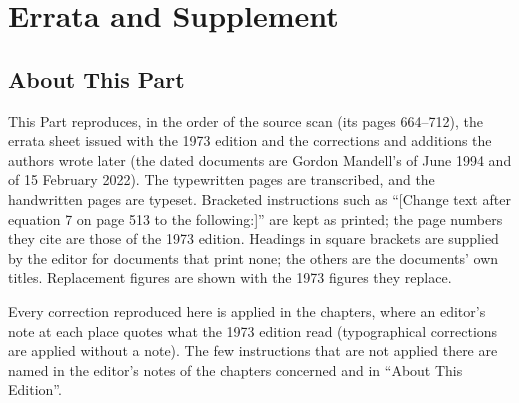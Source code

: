 \cleardoublepage
{}
{}
\part*{Errata and Supplement}
\label{supp}

\chapter*{About This Part}
\label{supp:about}
This Part reproduces, in the order of the source scan (its pages 664--712), the errata sheet issued
with the 1973 edition and the corrections and additions the authors wrote later (the dated
documents are Gordon Mandell's of June 1994 and of 15 February 2022). The
typewritten pages are transcribed, and the handwritten pages are typeset. Bracketed instructions
such as ``[Change text after equation 7 on page 513 to the following:]'' are kept as printed; the page
numbers they cite are those of the 1973 edition. Headings in square brackets are supplied by the editor for
documents that print none; the others are the documents' own titles. Replacement figures are shown with the 1973 figures they
replace.

Every correction reproduced here is applied in the chapters, where an editor's note at each place
quotes what the 1973 edition read (typographical corrections are applied without a note). The few
instructions that are not applied there are named in the editor's notes of the chapters concerned and
in ``About This Edition''.











